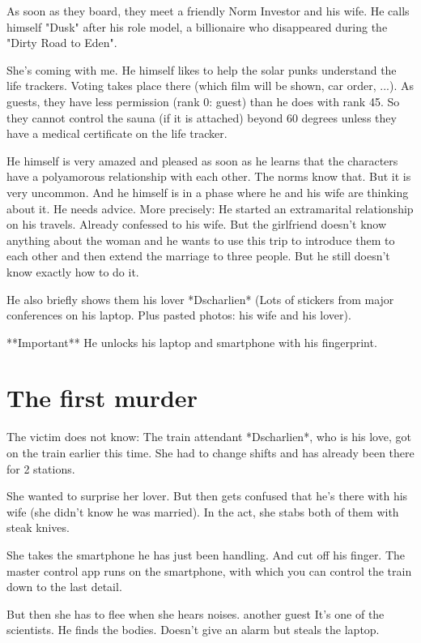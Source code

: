 \documentclass{book}
\begin{document}
As soon as they board, they meet a friendly Norm Investor and his wife. He calls himself "Dusk" after his role model, a billionaire who disappeared during the "Dirty Road to Eden".

She's coming with me. He himself likes to help the solar punks understand the life trackers. Voting takes place there (which film will be shown, car order, ...). As guests, they have less permission (rank 0: guest) than he does with rank 45. So they cannot control the sauna (if it is attached) beyond 60 degrees unless they have a medical certificate on the life tracker.

He himself is very amazed and pleased as soon as he learns that the characters have a polyamorous relationship with each other. The norms know that. But it is very uncommon. And he himself is in a phase where he and his wife are thinking about it. He needs advice. More precisely: He started an extramarital relationship on his travels. Already confessed to his wife. But the girlfriend doesn't know anything about the woman and he wants to use this trip to introduce them to each other and then extend the marriage to three people. But he still doesn't know exactly how to do it.

He also briefly shows them his lover *Dscharlien* (Lots of stickers from major conferences on his laptop. Plus pasted photos: his wife and his lover).

**Important** He unlocks his laptop and smartphone with his fingerprint.

\section{The first murder}


The victim does not know: The train attendant *Dscharlien*, who is his love, got on the train earlier this time. She had to change shifts and has already been there for 2 stations.

She wanted to surprise her lover. But then gets confused that he's there with his wife (she didn't know he was married). In the act, she stabs both of them with steak knives.

She takes the smartphone he has just been handling. And cut off his finger. The master control app runs on the smartphone, with which you can control the train down to the last detail.

But then she has to flee when she hears noises. another guest
It's one of the scientists. He finds the bodies. Doesn't give an alarm but steals the laptop.
\end{document}
